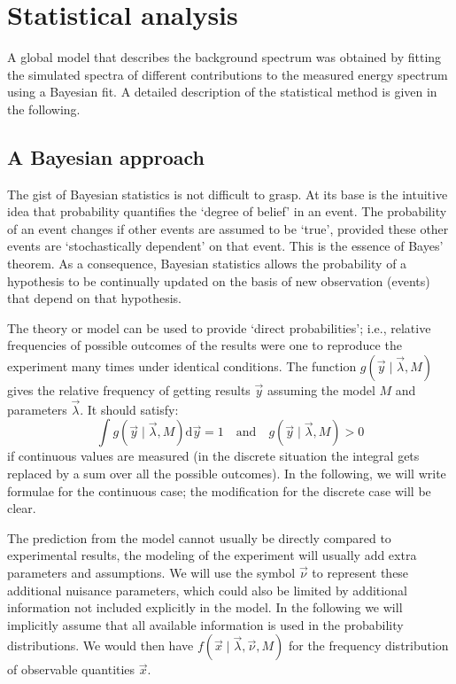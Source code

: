 \section{Statistical analysis}
A global model that describes the background spectrum was obtained by fitting the simulated spectra of different contributions to the measured energy spectrum using a Bayesian fit. A detailed description of the statistical method is given in the following.
\subsection{A Bayesian approach}
The gist of Bayesian statistics is not difficult to grasp. At its base is the intuitive idea that probability quantifies the `degree of belief' in an event. The probability of an event changes if other events are assumed to be `true', provided these other events are `stochastically dependent' on that event. This is the essence of Bayes' theorem. As a consequence, Bayesian statistics allows the probability of a hypothesis to be continually updated on the basis of new observation (events) that depend on that hypothesis. 

 The theory or model can be used to provide `direct probabilities'; i.e., relative frequencies of possible outcomes of the results were one to reproduce the experiment many times under identical conditions. The function $g(\vec{y}\mid\vec{\lambda},M)$ gives the relative frequency of getting results $\vec{y}$ assuming the model $M$ and parameters $\vec{\lambda}$. It should satisfy:
\[\int g(\vec{y}\mid\vec{\lambda},M)\text{d}\vec{y}=1 \quad\text{and}\quad g(\vec{y}\mid\vec{\lambda},M)>0\]
if continuous values are measured (in the discrete situation the integral gets replaced by a sum over all the possible outcomes). In the following, we will write formulae for the continuous case; the modification for the discrete case will be clear.

The prediction from the model cannot usually be directly compared to experimental results, the modeling of the experiment will usually add extra parameters and assumptions. We will use the symbol $\vec{\nu}$ to represent these additional nuisance parameters, which could also be limited by additional information not included explicitly in the model. In the following we will implicitly assume that all available information is used in the probability distributions. We would then have $f(\vec{x}\mid\vec{\lambda},\vec{\nu},M)$ for the frequency distribution of observable quantities $\vec{x}$.

